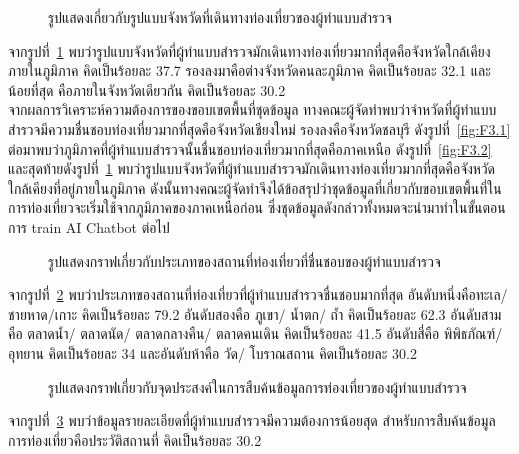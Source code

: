\documentclass[12pt,oneside,openright,a4paper]{cpe-thai-project}
\begin{document}
\begin{figure}[!h]\centering
\setlength{\fboxrule}{0mm}
\caption{รูปแสดงเกี่ยวกับรูปแบบจังหวัดที่เดินทางท่องเที่ยวของผู้ทำแบบสำรวจ}\label{fig:F3.3}
\end{figure}
จากรูปที่~\ref{fig:F3.3} พบว่ารูปแบบจังหวัดที่ผู้ทำแบบสำรวจมักเดินทางท่องเที่ยวมากที่สุดคือจังหวัดใกล้เคียงภายในภูมิภาค คิดเป็นร้อยละ 37.7 รองลงมาคือต่างจังหวัดคนละภูมิภาค คิดเป็นร้อยละ 32.1 และน้อยที่สุด คือภายในจังหวัดเดียวกัน คิดเป็นร้อยละ 30.2 \\

จากผลการวิเคราะห์ความต้องการของขอบเขตพื้นที่ชุดข้อมูล ทางคณะผู้จัดทำพบว่าจำหวัดที่ผู้ทำแบบสำรวจมีความชื่นชอบท่องเที่ยวมากที่สุดคือจังหวัดเชียงใหม่ รองลงคือจังหวัดชลบุรี ดังรูปที่~\ref{fig:F3.1} ต่อมาพบว่าภูมิภาคที่ผู้ทำแบบสำรวจนั้นชื่นชอบท่องเที่ยวมากที่สุดคือภาคเหนือ ดังรูปที่~\ref{fig:F3.2} และสุดท้ายดังรูปที่~\ref{fig:F3.3} พบว่ารูปแบบจังหวัดที่ผู้ทำแบบสำรวจมักเดินทางท่องเที่ยวมากที่สุดคือจังหวัดใกล้เคียงที่อยู่ภายในภูมิภาค ดังนั้นทางคณะผู้จัดทำจึงได้ข้อสรุปว่าชุดข้อมูลที่เกี่ยวกับขอบเขตพื้นที่ในการท่องเที่ยวจะเริ่มใช้จากภูมิภาคของภาคเหนือก่อน ซึ่งชุดข้อมูลดังกล่าวทั้งหมดจะนำมาทำในขั้นตอนการ train AI Chatbot ต่อไป \newpage

\begin{figure}[!h]\centering
\setlength{\fboxrule}{0mm}
\caption{รูปแสดงกราฟเกี่ยวกับประเภทของสถานที่ท่องเที่ยวที่ชื่นชอบของผู้ทำแบบสำรวจ}\label{fig:F3.4}
\end{figure}
จากรูปที่~\ref{fig:F3.4} พบว่าประเภทของสถานที่ท่องเที่ยวที่ผู้ทำแบบสำรวจชื่นชอบมากที่สุด อันดับหนึ่งคือทะเล/ชายหาด/เกาะ คิดเป็นร้อยละ 79.2 อันดับสองคือ ภูเขา/ น้ำตก/ ถ้ำ คิดเป็นร้อยละ 62.3 อันดับสามคือ ตลาดน้ำ/ ตลาดนัด/ ตลาดกลางคืน/ ตลาดคนเดิน คิดเป็นร้อยละ 41.5 อันดับสี่คือ พิพิธภัณฑ์/ อุทยาน คิดเป็นร้อยละ 34 และอันดับห้าคือ วัด/ โบราณสถาน คิดเป็นร้อยละ 30.2 \\

\begin{figure}[!h]\centering
\setlength{\fboxrule}{0mm}
\caption{รูปแสดงกราฟเกี่ยวกับจุดประสงค์ในการสืบค้นข้อมูลการท่องเที่ยวของผู้ทำแบบสำรวจ}\label{fig:F3.5}
\end{figure}
จากรูปที่~\ref{fig:F3.5} พบว่าข้อมูลรายละเอียดที่ผู้ทำแบบสำรวจมีความต้องการน้อยสุด สำหรับการสืบค้นข้อมูลการท่องเที่ยวคือประวัติสถานที่ คิดเป็นร้อยละ 30.2 \\
\end{document}
